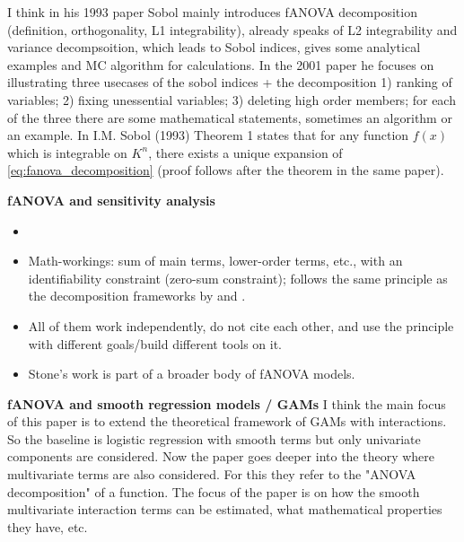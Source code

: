 I think in his 1993 paper Sobol mainly introduces fANOVA decomposition (definition, orthogonality, L1 integrability), already speaks of L2 integrability and variance decompsoition, which leads to Sobol indices, gives some analytical examples and MC algorithm for calculations.
In the 2001 paper he focuses on illustrating three usecases of the sobol indices + the decomposition 1) ranking of variables; 2) fixing unessential variables; 3) deleting high order members; for each of the three there are some mathematical statements, sometimes an algorithm or an example.
In I.M. Sobol (1993) Theorem 1 states that for any function $f(x)$ which is integrable on $K^n$, there exists a unique expansion of \autoref{eq:fanova_decomposition} (proof follows after the theorem in the same paper).

\textbf{fANOVA and sensitivity analysis}


\begin{itemize}
    \item \cite{stone_use_1994}
    \item Math-workings: sum of main terms, lower-order terms, etc., with an identifiability constraint (zero-sum constraint); follows the same principle as the decomposition frameworks by \cite{hoeffding_class_1948} and \cite{sobol_global_2001}.
    \item All of them work independently, do not cite each other, and use the principle with different goals/build different tools on it.
    \item Stone's work is part of a broader body of fANOVA models.
\end{itemize}
\textbf{fANOVA and smooth regression models / GAMs}
I think the main focus of this paper is to extend the theoretical framework of GAMs with interactions. So the baseline is logistic regression with smooth terms but only univariate components are considered. Now the paper goes deeper into the theory where multivariate terms are also considered. For this they refer to the "ANOVA decomposition" of a function. The focus of the paper is on how the smooth multivariate interaction terms can be estimated, what mathematical properties they have, etc.


